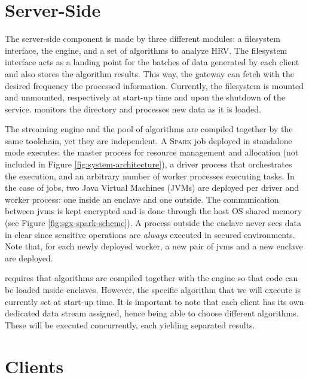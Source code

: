 \section{Server-Side} \label{sec:server}

The server-side component is made by three different modules: a filesystem interface, the \sgxspark engine, and a set of algorithms to analyze HRV. 
The filesystem interface acts as a landing point for the batches of data generated by each client and also stores the algorithm results.
This way, the gateway can fetch with the desired frequency the processed information.
Currently, the filesystem is mounted and unmounted, respectively at start-up time and upon the shutdown of the service. 
\sgxspark monitors the directory and processes new data as it is loaded.

The streaming engine and the pool of algorithms are compiled together by the same toolchain, yet they are independent. 
A \textsc{Spark} job deployed in standalone mode executes: the master process for resource management and allocation (not included in Figure \ref{fig:system-architecture}), a driver process that orchestrates the execution, and an arbitrary number of worker processes executing tasks.
In the case of \sgxspark jobs, two Java Virtual Machines (JVMs) are deployed per driver and worker process: one inside an enclave and one outside.
The communication between \acrshort{jvm}s is kept encrypted and is done through the host OS shared memory (see Figure \ref{fig:sgx-spark-scheme}).
A process outside the enclave never sees data in clear since sensitive operations are \emph{always} executed in secured environments.
Note that, for each newly deployed worker, a new pair of \acrshort{jvm}s and a new enclave are deployed.

\sgxspark requires that algorithms are compiled together with the engine so that code can be loaded inside enclaves.
However, the specific algorithm that we will execute is currently set at start-up time.
It is important to note that each client has its own dedicated data stream assigned, hence being able to choose different algorithms.
These will be executed concurrently, each yielding separated results. 

\section{Clients} \label{sec:clients}

